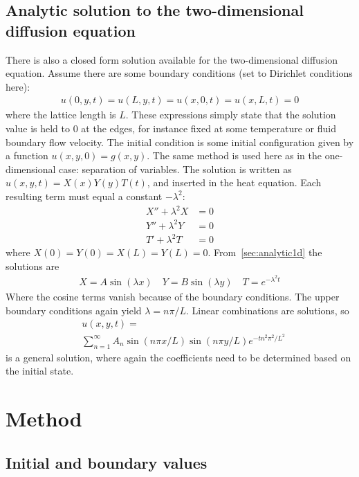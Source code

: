 \documentclass[aps,reprint]{revtex4-1}
\begin{document}
\subsection{Analytic solution to the two-dimensional diffusion equation}
There is also a closed form solution available for the two-dimensional diffusion equation.
Assume there are some boundary conditions (set to Dirichlet conditions here):
\begin{align*}
  u(0, y, t) = u(L, y, t) = u(x, 0, t) = u(x, L, t) = 0
\end{align*}
where the lattice length is $L$. These expressions simply state that the solution
value is held to $0$ at the edges, for instance fixed at some temperature or fluid
boundary flow velocity. The initial condition is some initial configuration given by a function $u(x,y,0) = g(x,y)$.
The same method is used here as in the one-dimensional case: separation of variables. The solution
is written as $u(x,y,t) = X(x) Y(y) T(t)$, and inserted in the heat equation. Each resulting
term must equal a constant $-\lambda^2$:
\begin{align*}
  X'' + \lambda^2 X &= 0 \\
  Y'' + \lambda^2 Y &= 0 \\
  T'  + \lambda^2 T &= 0
\end{align*}
where $X(0) = Y(0) = X(L) = Y(L) = 0$. From~\ref{sec:analytic1d} the solutions are
\begin{align*}
  X = A \sin{(\lambda x)} \quad Y = B \sin{(\lambda y)} \quad T = e^{-\lambda^2 t}
\end{align*}
Where the cosine terms vanish because of the boundary conditions. The upper
boundary conditions again yield $\lambda = n \pi / L$. Linear combinations
are solutions, so
\begin{align*}
  &u(x,y,t) = \\&\sum_{n = 1}^{\infty} A_{n} \sin{(n \pi x / L)} \sin{(n \pi y / L)} e^{- t n^2 \pi^2 / L^2}
\end{align*}
is a general solution, where again the coefficients need to be determined based
on the initial state.
\section{Method} \label{sec:method}
\subsection{Initial and boundary values}
\end{document}
